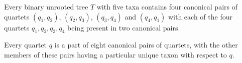 \documentclass[runningheads]{llncs}
\begin{document}

\vspace{-7pt}
\begin{corollary}
\label{cor:two-pair-quartets}
 
Every binary unrooted tree $T$ with five taxa contains four canonical pairs of quartets $(q_1,q_2)$, $(q_2,q_3)$, $(q_3,q_4)$ and $(q_4,q_1)$ with each of the four quartets $q_1, q_2, q_3, q_4$ being present in two canonical pairs. 
\end{corollary}

\vspace{-15pt}
\begin{corollary}
\label{cor:eight-pairs}
Every quartet $q$ is a part of eight canonical pairs of quartets, with the other members of these pairs having a particular unique taxon with respect to $q$. 
\end{corollary}



\end{document}
